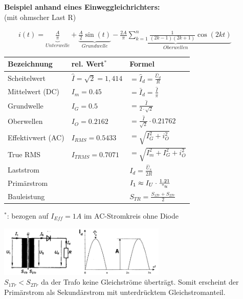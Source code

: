 	\begin{minipage}[c]{8cm} 
	   \textbf{Beispiel anhand eines Einweggleichrichters:}	  	\\
	   (mit ohmscher Last R) 
	\end{minipage}   
	\begin{minipage}[c]{10cm} 	
	   $ \qquad i(t) = \underbrace{\frac{A}{\pi}}_{Unterwelle} + \underbrace{\frac{A}{2}
	   \sin(t)}_{Grundwelle} - \underbrace{\frac{2A}{\pi} \sum\limits_{k=1}^n \frac{1}{(2k-1)(2k+1)} \cos(2kt)}_{Oberwellen} $
	\end{minipage}   
		
	\begin{minipage}[c]{10cm}  
		\begin{tabular}{| l | l | l |}
    		\hline 
      		\textbf{Bezeichnung}
      		& \textbf{rel. Wert$^\ast$}
      		& \textbf{Formel} \\
      		\hline
      		Scheitelwert
      		& $\hat{I} = \sqrt{2} = 1,414$
      		& $= \hat{I}_d = \frac{\hat{U}_d}{R} $ \\
      		Mittelwert (DC)
      		& $I_m = 0.45$
      		& $= \bar{I}_d = \frac{\hat{I}}{\pi}$ \\
      		Grundwelle
      		& $I_G = 0.5$
      		& $= \frac{\hat{I}}{2 \cdot \sqrt{2}}$ \\
      		Oberwellen
      		& $I_O = 0.2162$
      		& $= \frac{\hat{I}}{\sqrt{2}} \cdot 0.21762$ \\
      		Effektivwert (AC)
      		& $I_{RMS} = 0.5433$
      		& $ = \sqrt{I_G^2 + i_O^2}$\\
      		True RMS
      		& $I_{TRMS} = 0.7071$
      		& $= \sqrt{I_m^2 + I_G^2 + i_O^2}$ \\
      		Laststrom
      		&
      		& $I_{d} =\frac{\hat{U}_s}{2 R}$ \\
      		Primärstrom
      		&
      		& $I_1 \approx I_U \cdot \frac{1.21}{"u}$ \\
      		Bauleistung 
      		&
      		& $S_{TR} = \frac{S_{1Tr} + S_{2Tr}}{2}$ \\
      		\hline 
    	\end{tabular} \newline
    	$^\ast$: bezogen auf $I_{Eff} = 1A$ im AC-Stromkreis ohne Diode
	\end{minipage}   
	\begin{minipage}[c]{8cm}  
			\includegraphics[width=8cm]{bilder/EinwegGR.png}  \\			
	$S_{1Tr} < S_{2Tr}$ da der Trafo keine Gleichstr\"ome übertr\"agt. Somit erscheint der Prim\"arstrom
	als Sekund\"arstrom mit unterdrücktem Gleichstromanteil.			
	\end{minipage}

